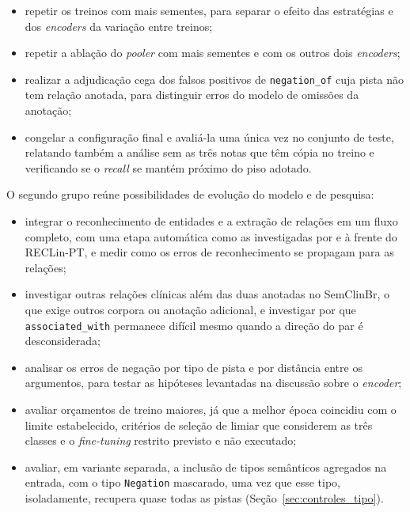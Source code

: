 \begin{itemize}
  \item repetir os treinos com mais sementes, para separar o efeito das estratégias
        e dos \emph{encoders} da variação entre treinos;
  \item repetir a ablação do \emph{pooler} com mais sementes e com os outros dois
        \emph{encoders};
  \item realizar a adjudicação cega dos falsos positivos de \texttt{negation\_of}
        cuja pista não tem relação anotada, para distinguir erros do modelo de
        omissões da anotação;
  \item congelar a configuração final e avaliá-la uma única vez no conjunto de
        teste, relatando também a análise sem as três notas que têm cópia no treino
        e verificando se o \emph{recall} se mantém próximo do piso adotado.
\end{itemize}

O segundo grupo reúne possibilidades de evolução do modelo e de pesquisa:

\begin{itemize}
  \item integrar o reconhecimento de entidades e a extração de relações em um fluxo
        completo, com uma etapa automática como as investigadas por
         e  à frente
        do RECLin-PT, e medir como os erros de reconhecimento se propagam para as
        relações;
  \item investigar outras relações clínicas além das duas anotadas no SemClinBr, o
        que exige outros corpora ou anotação adicional, e investigar por que
        \texttt{associated\_with} permanece difícil mesmo quando a direção do par
        é desconsiderada;
  \item analisar os erros de negação por tipo de pista e por distância entre os
        argumentos, para testar as hipóteses levantadas na discussão sobre o
        \emph{encoder};
  \item avaliar orçamentos de treino maiores, já que a melhor época coincidiu com
        o limite estabelecido, critérios de seleção de limiar que considerem as
        três classes e o \emph{fine-tuning} restrito previsto e não executado;
  \item avaliar, em variante separada, a inclusão de tipos semânticos agregados na
        entrada, com o tipo \texttt{Negation} mascarado, uma vez que esse tipo,
        isoladamente, recupera quase todas as pistas
        (Seção~\ref{sec:controles_tipo}).
\end{itemize}
